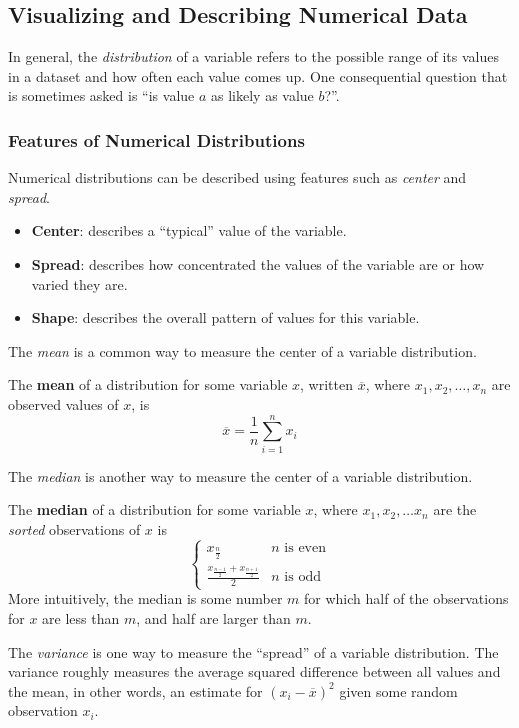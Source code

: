 \documentclass[10pt]{article}
\newenvironment{definition}[1][]{\begin{tcolorbox}[colframe=_orange,colback=_orange2,title=Definition. \ifthenelse{\isempty{#1}}{}{(#1)}
]}{\end{tcolorbox}}
\newcommand{\spacer}[0]{\par\vspace{0.1in}}
\begin{document}
\subsection{Visualizing and Describing Numerical Data}
In general, the \textit{distribution} of a variable refers to the possible range of its values in a dataset and how often each value comes up. One consequential question that is sometimes asked is ``is value $a$ as likely as value $b$?''.
\subsubsection{Features of Numerical Distributions}
Numerical distributions can be described using features such as \textit{center} and \textit{spread}.
\begin{itemize}
    \item \textbf{Center}: describes a ``typical'' value of the variable.
    \item \textbf{Spread}: describes how concentrated the values of the variable are or how varied they are.
    \item \textbf{Shape}: describes the overall pattern of values for this variable.
\end{itemize}
\spacer
The \textit{mean} is a common way to measure the center of a variable distribution.
\begin{definition}[Mean]
    The \textbf{mean} of a distribution for some variable $x$, written $\overline x$, where $x_1,x_2,\dots,x_n$ are observed values of $x$, is
    $$
        \overline x = \frac{1}{n}\sum_{i=1}^n x_i
    $$
\end{definition}
The \textit{median} is another way to measure the center of a variable distribution.
\begin{definition}[Median]
    The \textbf{median} of a distribution for some variable $x$, where $x_1,x_2,\dots x_n$ are the \textit{sorted} observations of $x$ is
    $$
        \begin{cases}x_{\frac{n}{2}}&n\text{ is even}\\\frac{x_{\frac{n-1}{2}}+x_{\frac{n+1}{2}}}{2}&n\text{ is odd}\end{cases}
    $$
    More intuitively, the median is some number $m$ for which half of the observations for $x$ are less than $m$, and half are larger than $m$.
\end{definition}
The \textit{variance} is one way to measure the ``spread'' of a variable distribution. The variance roughly measures the average squared difference between all values and the mean, in other words, an estimate for $(x_i-\overline x)^2$ given some random observation $x_i$.
\end{document}
